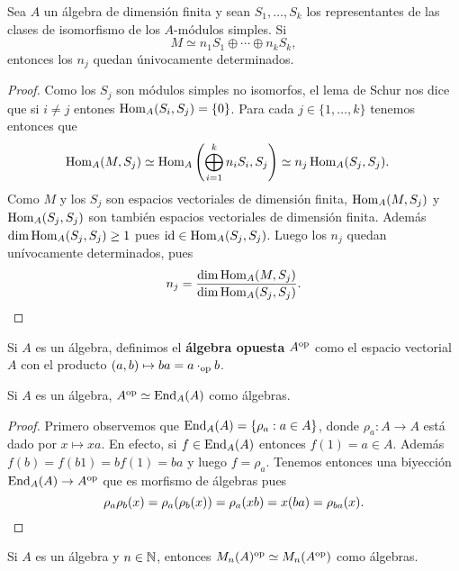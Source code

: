 \begin{theorem}
Sea $A$ un álgebra de dimensión finita y sean 
$S_1,\dots,S_k$ los representantes de las clases de isomorfismo de los $A$-módulos simples. 
Si \[
M\simeq n_1S_1\oplus\cdots\oplus n_kS_k,
\]
entonces
los $n_j$ quedan únivocamente determinados. 
\end{theorem}

\begin{proof}
	Como los $S_j$ son módulos simples no isomorfos, 
	el lema de Schur nos dice que si $i\ne j$ entones $\operatorname{Hom}_A(S_i,S_j)=\{0\}$.
	Para cada $j\in\{1,\dots,k\}$ tenemos entonces que  
	\begin{align*}
		\operatorname{Hom}_A(M,S_j) &\simeq \operatorname{Hom}_A\left(\bigoplus_{i=1}^k n_i S_i,S_j\right)
		\simeq n_j\operatorname{Hom}_A(S_j,S_j). 
	\end{align*} 
	Como $M$ y los $S_j$ son espacios vectoriales de dimensión finita, $\operatorname{Hom}_A(M,S_j)$ y $\operatorname{Hom}_A(S_j,S_j)$ 
	son también espacios vectoriales de dimensión finita. 
	Además $\dim\operatorname{Hom}_A(S_j,S_j)\geq 1$ pues $\operatorname{id}\in\operatorname{Hom}_A(S_j,S_j)$. 
	Luego los $n_j$ quedan unívocamente determinados, pues 
	\[ 
	n_j=\frac{\dim\operatorname{Hom}_A(M,S_j)}{\dim\operatorname{Hom}_A(S_j,S_j)}.\qedhere
	\]
\end{proof}


Si $A$ es un álgebra, definimos el \textbf{álgebra opuesta} $A^{\operatorname{op}}$ como
el espacio vectorial $A$ con el producto $(a,b)\mapsto ba=a\cdot_{\operatorname{op}}b$. 

\begin{lemma}
	\label{lem:A^op}
    Si $A$ es un álgebra, $A^{\operatorname{op}}\simeq\operatorname{End}_A(A)$ como álgebras. 
\end{lemma}

\begin{proof}
	Primero observemos que $\operatorname{End}_A(A)=\{\rho_a:a\in A\}$, donde $\rho_a\colon
	A\to A$ está dado por $x\mapsto xa$. En efecto, si $f\in\operatorname{End}_A(A)$
	entonces $f(1)=a\in A$. Además $f(b)=f(b1)=bf(1)=ba$ y luego
	$f=\rho_a$.  Tenemos entonces una biyección $\operatorname{End}_A(A)\to A^{\operatorname{op}}$ que es
	morfismo de álgebras pues 
    \[
		\rho_a\rho_b(x)=\rho_a(\rho_b(x))=\rho_a(xb)=x(ba)=\rho_{ba}(x).\qedhere
    \]
\end{proof}

\begin{lemma}
	\label{lem:Mn_op}
	Si $A$ es un álgebra y $n\in\mathbb{N}$, entonces $M_n(A)^{\operatorname{op}}\simeq
	M_n(A^{\operatorname{op}})$ como álgebras.   
\end{lemma}

